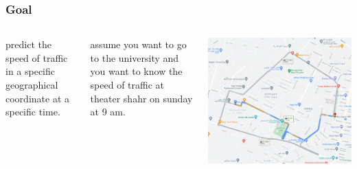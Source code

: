 \documentclass{beamer}
\begin{document}
\begin{frame}
	\frametitle{Goal}
	\begin{columns}
			\begin{definition}
				predict the speed of traffic in a specific geographical coordinate at a specific time.
			\end{definition}
			\pause
			\begin{example}
				assume you want to go to the university and you want to know the speed of traffic at theater shahr on sunday at 9 am.
			\end{example}
		\pause
			\includegraphics[height=0.5\textheight]{./img/intro.png}
	\end{columns}
\end{frame}
\end{document}
